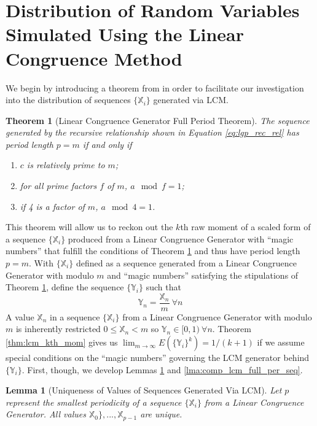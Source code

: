 \documentclass{article}
\theoremstyle{break}
\newtheorem{theorem}{Theorem}[section]
\newtheorem{lemma}{Lemma}[section]
\begin{document}
\section{Distribution of Random Variables Simulated Using the Linear Congruence Method} \label{sec:distribution}
We begin by introducing a theorem from \autocite{hull_random_1962} in order to facilitate our investigation into the distribution of sequences $\{\mathbb{X}_i\}$ generated via LCM.
\begin{theorem}[Linear Congruence Generator Full Period Theorem] \label{thm:full_period}
The sequence generated by the recursive relationship shown in Equation \ref{eq:lgp_rec_rel} has period length $p = m$ if and only if
\begin{enumerate}
\item $c$ is relatively prime to $m$;
\item for all prime factors $f$ of $m$, $a \mod f = 1$;
\item if 4 is a factor of $m$, $a \mod 4 = 1$.
\end{enumerate}
\end{theorem}
This theorem will allow us to reckon out the $k$th raw moment of a scaled form of a sequence $\{\mathbb{X}_{i}\}$ produced from a Linear Congruence Generator with ``magic numbers'' that fulfill the conditions of Theorem \ref{thm:full_period} and thus have period length $p = m$. With $\{\mathbb{X}_{i}\}$ defined as a sequence generated from a Linear Congruence Generator with modulo $m$ and ``magic numbers'' satisfying the stipulations of Theorem \ref{thm:full_period}, define the sequence $\{\mathbb{Y}_{i}\}$ such that
\begin{equation} \label{eqn:scaled_lcs}
 \mathbb{Y}_{n} = \frac{\mathbb{X}_{n}}{m} ~ \forall n
\end{equation}
A value $\mathbb{X}_n$ in a sequence $\{\mathbb{X}_i\}$ from a Linear Congruence Generator with modulo $m$ is inherently restricted $0 \leq \mathbb{X}_n < m$ so $\mathbb{Y}_{n} \in [0,1) ~ \forall n$. Theorem \ref{thm:lcm_kth_mom} gives us $\lim_{m \rightarrow \infty} E(\{\mathbb{Y}_{i}\}^k) = 1/(k+1)$ if we assume special conditions on the ``magic numbers'' governing the LCM generator behind $\{\mathbb{Y}_{i}\}$. First, though, we develop Lemmas \ref{lma:uniq_val} and \ref{lma:comp_lcm_full_per_seq}.
\begin{lemma}[Uniqueness of Values of Sequences Generated Via LCM] \label{lma:uniq_val}
Let $p$ represent the smallest periodicity of a sequence $\{\mathbb{X}_i\}$ from a Linear Congruence Generator. All values $\mathbb{X}_0\}, ..., \mathbb{X}_{p-1}$ are unique.
\end{lemma}
\end{document}
